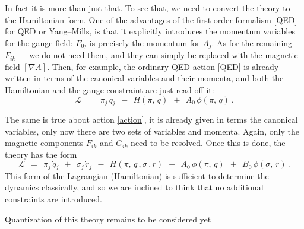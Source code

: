 \documentclass[epsfig,12pt]{article}
\newcommand{\cell}{{\mathcal L}}
\begin{document}
	In fact it is more than just that.
	To see that, we need to convert the theory to the Hamiltonian form.
	One of the advantages of the first order formalism \eqref{QED} for QED or Yang--Mills, is that it explicitly introduces 
	the momentum variables for the gauge field: $ F_{0j} $ is precisely the momentum for $ A_j $.
	As for the remaining $ F_{ik} $  --- we do not need them, 
	and they can simply be replaced with the magnetic field $ [ \nabla A ] $.
	Then, for example, the ordinary QED action \eqref{QED} is already written in terms of the canonical variables and their momenta,
	and both the Hamiltonian and the gauge constraint are just read off it:
\[
	\cell    ~~=~~    \pi_j\, \dot{q}{}_j  ~~-~~  H(\pi,\, q)  ~~+~~  A_0\, \phi(\pi,\, q)\,.
\]

	The same is true about action \eqref{action}, it is already given in terms the canonical variables,
	only now there are two sets of variables and momenta.
	Again, only the magnetic components $ F_{ik} $ and $ G_{ik} $ need to be resolved. 
	Once this is done, the theory has the form 
\[
	\cell    ~~=~~    \pi_j\, \dot{q}{}_j  ~~+~~ \sigma_j\, \dot{r}{}_j  ~~-~~  H(\pi,\, q\,, \sigma\,, r)  
	~~+~~  A_0\, \phi(\pi,\, q)  ~~+~~  B_0\, \phi(\sigma,\, r)\,.
\]
	This form of the Lagrangian (Hamiltonian) is sufficient to determine the dynamics classically, and 
	so we are inclined to think that no additional constraints are introduced. 

	Quantization of this theory remains to be considered yet
\end{document}
